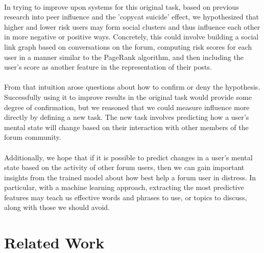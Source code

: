 \documentclass{article}
\begin{document}
\paragraph{}In trying to improve upon systems for this original task, based on previous research into peer influence and the 'copycat suicide' effect, we hypothesized that higher and lower risk users may form social clusters and thus influence each other in more negative or positive ways\cite{gladwell}\cite{phillips}\cite{stack}. Concretely, this could involve building a social link graph based on conversations on the forum, computing risk scores for each user in a manner similar to the PageRank algorithm, and then including the user's score as another feature in the representation of their posts.

\paragraph{}From that intuition arose questions about how to confirm or deny the hypothesis. Successfully using it to improve results in the original task would provide some degree of confirmation, but we reasoned that we could measure influence more directly by defining a new task. The new task involves predicting how a user's mental state will change based on their interaction with other members of the forum community.

\paragraph{}Additionally, we hope that if it is possible to predict changes in a user's mental state based on the activity of other forum users, then we can gain important insights from the trained model about how best help a forum user in distress. In particular, with a machine learning approach, extracting the most predictive features may teach us effective words and phrases to use, or topics to discuss, along with those we should avoid.

\section{Related Work}
\end{document}
